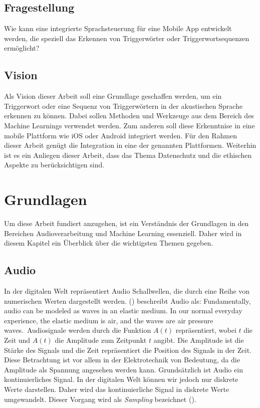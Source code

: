 \documentclass[11pt,a4paper]{article}
\begin{document}
\subsection{Fragestellung}
Wie kann eine integrierte Sprachsteuerung für eine Mobile App entwickelt werden, die speziell
das Erkennen von Triggerwörter oder Triggerwortsequenzen ermöglicht?


\subsection{Vision}
Als Vision dieser Arbeit soll eine Grundlage geschaffen werden, um ein Triggerwort
oder eine Sequenz von Triggerwörtern in der akustischen Sprache erkennen zu können.
Dabei sollen Methoden und Werkzeuge aus dem Bereich des Machine Learnings verwendet werden.
Zum anderen soll diese Erkenntnise in eine mobile Plattform wie iOS oder Android integriert
werden. Für den Rahmen dieser Arbeit genügt die Integration in eine der genannten Plattformen.
Weiterhin ist es ein Anliegen dieser Arbeit, dass das Thema Datenschutz und die ethischen Aspekte
zu berücksichtigen sind.


\newpage \section{Grundlagen}
Um diese Arbeit fundiert anzugehen, ist ein Verständnis der Grundlagen in den Bereichen
Audioverarbeitung und Machine Learning essenziell. Daher wird in diesem Kapitel ein Überblick
über die wichtigsten Themen gegeben.

\subsection{Audio}
In der digitalen Welt repräsentiert Audio Schallwellen, die durch eine Reihe von numerischen Werten
dargestellt werden. (\cite[p.9]{somberg2019audioapi}) beschreibt Audio als: \glqq Fundamentally,
audio can be modeled as waves in an elastic medium. In our normal everyday experience, the elastic
medium is air, and the waves are air pressure waves.\grqq \ Audiosignale werden durch die Funktion
\(A(t)\) repräsentiert, wobei \(t\) die Zeit und \(A(t)\) die Amplitude zum
Zeitpunkt \(t\) angibt. Die Amplitude ist die Stärke des Signals und die Zeit repräsentiert die
Position des Signals in der Zeit. Diese Betrachtung ist vor allem in der Elektrotechnik
von Bedeutung, da die Amplitude als Spannung angesehen werden kann. Grundsätzlich ist Audio ein
kontinuierliches Signal. In der digitalen Welt können wir jedoch nur diskrete Werte darstellen.
Daher wird das kontinuierliche Signal in diskrete Werte umgewandelt. Dieser Vorgang wird als
\textit{Sampling} bezeichnet (\cite[Chapter~3.1]{tarr2018hackaudio}).
\end{document}
